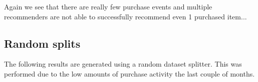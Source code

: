 Again we see that there are really few purchase events and multiple recommenders are not able to successfully recommend even 1 purchased item...


\subsection{Random splits}

The following results are generated using a random dataset splitter. This was performed due to the low amounts of purchase activity the last couple of months.


\begin{table}[H]
\centering
{}
\end{table}

